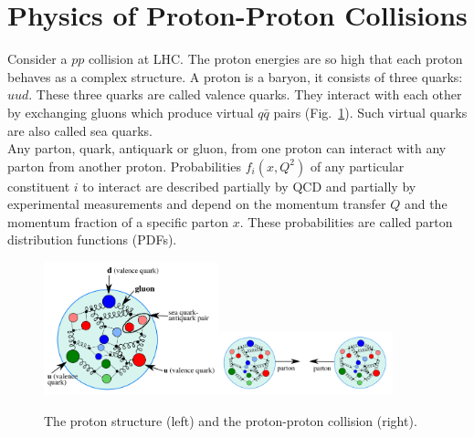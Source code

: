 \section{Physics of Proton-Proton Collisions}
\label{sec:Intro_ppCollisions}

Consider a $pp$ collision at LHC. The proton energies are so high that each proton behaves as a complex structure. A proton is a baryon, it consists of three quarks: $uud$. These three quarks are called valence quarks. They interact with each other by exchanging gluons which produce virtual $q\bar{q}$ pairs (Fig.~\ref{fig:ppCollision}). Such virtual quarks are also called sea quarks. \\

Any parton, quark, antiquark or gluon, from one proton can interact with any parton from another proton. Probabilities $f_i(x,Q^2)$ of any particular constituent $i$ to interact are described partially by QCD and partially by experimental measurements and depend on the momentum transfer $Q$ and the momentum fraction of a specific parton $x$. These probabilities are called parton distribution functions (PDFs).\\

\begin{figure}[htb]
  \begin{center}
    {\includegraphics[width=0.45\textwidth]{../figs/Intro/protonStructure.png}\includegraphics[width=0.45\textwidth]{../figs/Intro/ppCollision.png}}
    \caption{The proton structure (left) and the proton-proton collision (right).}
    \label{fig:ppCollision}
  \end{center}
\end{figure}

